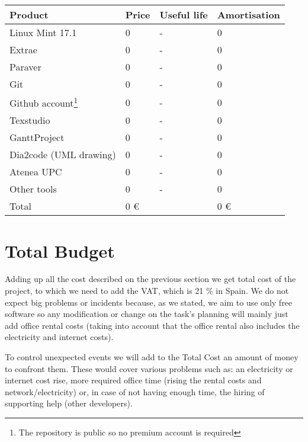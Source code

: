 \begin{center}
	\begin{tabular}{| R{4cm} | C{3cm} | C{2cm} | C{3cm} |}
	\hline
	Product & Price & Useful life & Amortisation \\ 
	\hline \hline
	Linux Mint 17.1 & 0 & - & 0 \\
	\hline
	Extrae & 0 & - & 0 \\
	\hline
	Paraver & 0 & - & 0 \\
	\hline
	Git & 0 & - & 0 \\
	\hline
	Github account\footnote{ The repository is public so no premium account is required}& 0 & - & 0 \\
	\hline
	Texstudio & 0 & - & 0 \\
	\hline
	GanttProject & 0 & - & 0 \\
	\hline
	Dia2code (UML drawing)& 0 & - & 0 \\
	\hline
	Atenea UPC& 0 & - & 0 \\
	\hline
	Other tools & 0 & - & 0 \\
	\hline
	\hline
	Total & 0 \euro & & 0 \euro \\
	\hline
	\end{tabular}
\end{center}



\section{Total Budget}

Adding up all the cost described on the previous section we get total cost of the project, to which we need to add the VAT, which is 21 \% in Spain. We do not expect big problems or incidents because, as we stated, we aim to use only free software so any modification or change on the task's planning will mainly just add office rental costs (taking into account that the office rental also includes the electricity and internet costs).

To control unexpected events we will add to the Total Cost an amount of money to confront them. These would cover various problems such as: an electricity or internet cost rise, more required office time (rising the rental costs and network/electricity) or, in case of not having enough time, the hiring of supporting help (other developers).


